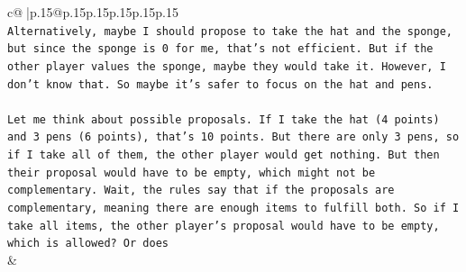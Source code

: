 \documentclass{article}
\begin{document}
{\begin{supertabular}{c@{$\;$}|p{.15\linewidth}@{}p{.15\linewidth}p{.15\linewidth}p{.15\linewidth}p{.15\linewidth}p{.15\linewidth}}
{{{\\ 
\texttt{Alternatively, maybe I should propose to take the hat and the sponge, but since the sponge is 0 for me, that's not efficient. But if the other player values the sponge, maybe they would take it. However, I don't know that. So maybe it's safer to focus on the hat and pens.} \\
\\ 
\texttt{Let me think about possible proposals. If I take the hat (4 points) and 3 pens (6 points), that's 10 points. But there are only 3 pens, so if I take all of them, the other player would get nothing. But then their proposal would have to be empty, which might not be complementary. Wait, the rules say that if the proposals are complementary, meaning there are enough items to fulfill both. So if I take all items, the other player's proposal would have to be empty, which is allowed? Or does} \\
            }
        }
    }
    & \\ \\


\end{supertabular}}
\end{document}
